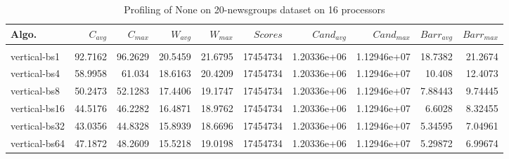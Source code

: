 \begin{table*}[htbp]
\centering
 \begin{tabular}{l r r r r r r r r r}
Algo. & $C_{avg}$ & $C_{max}$ & $W_{avg}$ & $W_{max}$ & $Scores$ & $Cand_{avg}$ & $Cand_{max}$ & $Barr_{avg}$ & $Barr_{max}$ \\
\hline \\
vertical-bs1 & 92.7162 & 96.2629 & 20.5459 & 21.6795 & 17454734 & 1.20336e+06 & 1.12946e+07 & 18.7382 & 21.2674 \\
vertical-bs4 & 58.9958 & 61.034 & 18.6163 & 20.4209 & 17454734 & 1.20336e+06 & 1.12946e+07 & 10.408 & 12.4073 \\
vertical-bs8 & 50.2473 & 52.1283 & 17.4406 & 19.1747 & 17454734 & 1.20336e+06 & 1.12946e+07 & 7.88443 & 9.74445 \\
vertical-bs16 & 44.5176 & 46.2282 & 16.4871 & 18.9762 & 17454734 & 1.20336e+06 & 1.12946e+07 & 6.6028 & 8.32455 \\
vertical-bs32 & 43.0356 & 44.8328 & 15.8939 & 18.6696 & 17454734 & 1.20336e+06 & 1.12946e+07 & 5.34595 & 7.04961 \\
vertical-bs64 & 47.1872 & 48.2609 & 15.5218 & 19.0198 & 17454734 & 1.20336e+06 & 1.12946e+07 & 5.29872 & 6.99674 \\
 
\end{tabular}
\caption{Profiling of None on 20-newsgroups dataset on 16 processors }
\label{tab:20-newsgroups:16}
\end{table*}
